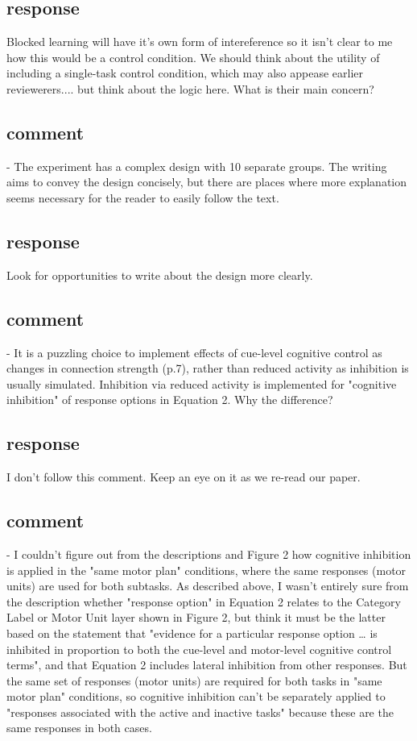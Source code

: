 \subsection{response}
Blocked learning will have it's own form of intereference so
it isn't clear to me how this would be a control condition.
We should think about the utility of including a single-task
control condition, which may also appease earlier
reviewerers.... but think about the logic here. What is
their main concern?

\subsection{comment}
- The experiment has a complex design with 10 separate
groups. The writing aims to convey the design concisely,
but there are places where more explanation seems necessary
for the reader to easily follow the text.

\subsection{response}
Look for opportunities to write about the design more
clearly.

\subsection{comment}
- It is a puzzling choice to implement effects of cue-level
cognitive control as changes in connection strength (p.7),
rather than reduced activity as inhibition is usually
simulated. Inhibition via reduced activity is implemented
for "cognitive inhibition" of response options in Equation
2. Why the difference?

\subsection{response}
I don't follow this comment. Keep an eye on it as we re-read
our paper.

\subsection{comment}
- I couldn't figure out from the descriptions and Figure 2
how cognitive inhibition is applied in the "same motor plan"
conditions, where the same responses (motor units) are used
for both subtasks. As described above, I wasn't entirely
sure from the description whether "response option" in
Equation 2 relates to the Category Label or Motor Unit layer
shown in Figure 2, but think it must be the latter based on
the statement that "evidence for a particular response
option … is inhibited in proportion to both the cue-level
and motor-level cognitive control terms", and that Equation
2 includes lateral inhibition from other responses. But the
same set of responses (motor units) are required for both
tasks in "same motor plan" conditions, so cognitive
inhibition can't be separately applied to "responses
associated with the active and inactive tasks" because these
are the same responses in both cases.


